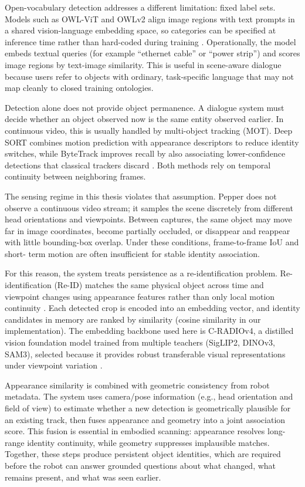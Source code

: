 Open-vocabulary detection addresses a different limitation: fixed label sets. Models such as OWL-ViT and OWLv2 align image regions with text prompts in a shared vision-language embedding space, so
categories can be specified at inference time rather than hard-coded during training \cite{minderer_simple_2022,minderer_scaling_2024}. Operationally, the model embeds textual queries (for example
\enquote{ethernet cable} or \enquote{power strip}) and scores image regions by text-image similarity. This is useful in scene-aware dialogue because users refer to objects with ordinary, task-specific
language that may not map cleanly to closed training ontologies.

Detection alone does not provide object permanence. A dialogue system must decide whether an object observed now is the same entity observed earlier. In continuous video, this is usually handled by
multi-object tracking (MOT). Deep SORT combines motion prediction with appearance descriptors to reduce identity switches, while ByteTrack improves recall by also associating lower-confidence
detections that classical trackers discard \cite{wojke_simple_2017,zhang_bytetrack_2022}. Both methods rely on temporal continuity between neighboring frames.

The sensing regime in this thesis violates that assumption. Pepper does not observe a continuous video stream; it samples the scene discretely from different head orientations and viewpoints. Between
captures, the same object may move far in image coordinates, become partially occluded, or disappear and reappear with little bounding-box overlap. Under these conditions, frame-to-frame IoU and short-
term motion are often insufficient for stable identity association.

For this reason, the system treats persistence as a re-identification problem. Re-identification (Re-ID) matches the same physical object across time and viewpoint changes using appearance features
rather than only local motion continuity \cite{ye_transformer_2024}. Each detected crop is encoded into an embedding vector, and identity candidates in memory are ranked by similarity (cosine
similarity in our implementation). The embedding backbone used here is C-RADIOv4, a distilled vision foundation model trained from multiple teachers (SigLIP2, DINOv3, SAM3), selected because it
provides robust transferable visual representations under viewpoint variation \cite{ranzinger2026cradiov4techreport}.

Appearance similarity is combined with geometric consistency from robot metadata. The system uses camera/pose information (e.g., head orientation and field of view) to estimate whether a new detection
is geometrically plausible for an existing track, then fuses appearance and geometry into a joint association score. This fusion is essential in embodied scanning: appearance resolves long-range
identity continuity, while geometry suppresses implausible matches. Together, these steps produce persistent object identities, which are required before the robot can answer grounded questions about
what changed, what remains present, and what was seen earlier.

